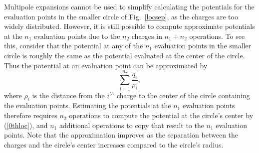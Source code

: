 Multipole expansions cannot be used to simplify calculating
the potentials for the evaluation points in the smaller circle of
Fig.~\ref{locsep}, as the charges are too widely distributed.
However, it is still possible to compute approximate potentials at the
$ n_1 $ evaluation points due to the $ n_2 $ charges in $ n_1 + n_2 $
operations.  To see this, consider that the potential at any of the $
n_1 $ evaluation points in the smaller circle  is
roughly the same as the potential evaluated at the center of
the circle.  Thus the potential at an evaluation point can be approximated by
\begin{equation}
\sum_{i=1}^{n_2}\frac{q_i}{\rho_i},
\label{0thloc}
\end{equation}
where $\rho_i$ is the distance from the $i^{th}$ charge to the center of
the circle containing the evaluation points.
Estimating the potentials at the $n_1 $ 
evaluation points therefore requires 
$ n_2 $ operations to compute the
potential at the circle's center by   (\ref{0thloc}), 
and $ n_1 $ additional operations to copy
that result to the $ n_1 $ evaluation points.  
Note that the approximation improves as
the separation between the charges and the circle's
center increases
compared to the circle's radius.

